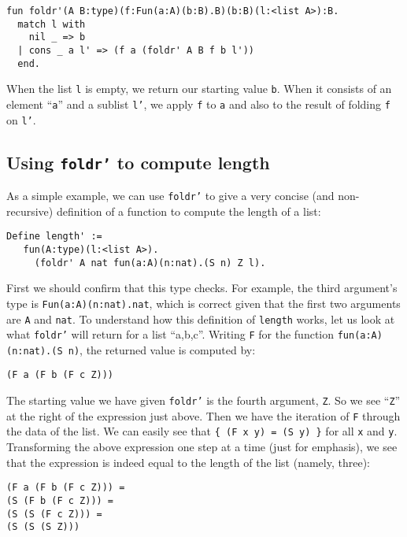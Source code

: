 \documentclass{book}[12pt]
\begin{document}
\begin{verbatim}
fun foldr'(A B:type)(f:Fun(a:A)(b:B).B)(b:B)(l:<list A>):B.
  match l with
    nil _ => b
  | cons _ a l' => (f a (foldr' A B f b l'))
  end.
\end{verbatim}

\noindent When the list \texttt{l} is empty, we return our starting
value \texttt{b}.  When it consists of an element ``\texttt{a}'' and a
sublist \texttt{l'}, we apply \texttt{f} to \texttt{a} and also to the
result of folding \texttt{f} on \texttt{l'}.

\subsection{Using \texttt{foldr'} to compute length}

As a simple example, we can use \texttt{foldr'} to give a very concise
(and non-recursive) definition of a function to compute the length of
a list:

\begin{verbatim}
Define length' :=
   fun(A:type)(l:<list A>).
     (foldr' A nat fun(a:A)(n:nat).(S n) Z l).
\end{verbatim}

\noindent First we should confirm that this type checks.  For example,
the third argument's type is \texttt{Fun(a:A)(n:nat).nat}, which is
correct given that the first two arguments are \texttt{A} and
\texttt{nat}.  To understand how this definition of \texttt{length}
works, let us look at what \texttt{foldr'} will return for a list
``a,b,c''.  Writing \texttt{F} for the function
\texttt{fun(a:A)(n:nat).(S n)}, the returned value is computed by:

\begin{verbatim}
(F a (F b (F c Z)))
\end{verbatim}

\noindent The starting value we have given \texttt{foldr'} is the
fourth argument, \texttt{Z}.  So we see ``\texttt{Z}'' at the right of
the expression just above.  Then we have the iteration of \texttt{F}
through the data of the list.  We can easily see that \texttt{\{ (F x
y) = (S y) \}} for all \texttt{x} and \texttt{y}.  Transforming the
above expression one step at a time (just for emphasis), we see that
the expression is indeed equal to the length of the list (namely,
three):

\begin{verbatim}
(F a (F b (F c Z))) =
(S (F b (F c Z))) =
(S (S (F c Z))) =
(S (S (S Z)))
\end{verbatim}
\end{document}
